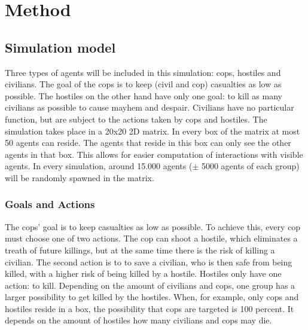 \section{Method}
\subsection{Simulation model}
Three types of agents will be included in this simulation: cops, hostiles and civilians. The goal of the cops is to keep (civil and cop) casualties as low as possible. The hostiles on the other hand have only one goal: to kill as many civilians as possible to cause mayhem and despair. Civilians have no particular function, but are subject to the actions taken by cops and hostiles. The simulation takes place in a 20x20 2D matrix. In every box of the matrix at most 50 agents can reside. The agents that reside in this box can only see the other agents in that box. This allows for easier computation of interactions with visible agents. In every simulation, around 15.000 agents ($\pm$ 5000 agents of each group) will be randomly spawned in the matrix.  

\subsubsection{Goals and Actions}
The cops' goal is to keep casualties as low as possible. To achieve this, every cop must choose one of two actions. The cop can shoot a hostile, which eliminates a treath of future killings, but at the same time there is the risk of killing a civilian. The second action is to to save a civilian, who is then safe from being killed, with a higher risk of being killed by a hostile. Hostiles only have one action: to kill. Depending on the amount of civilians and cops, one group has a larger possibility to get killed by the hostiles. When, for example, only cops and hostiles reside in a box, the possibility that cops are targeted is 100 percent. It depends on the amount of hostiles how many civilians and cops may die.

